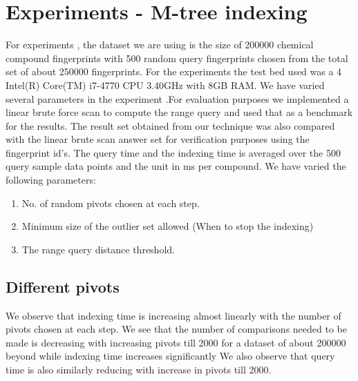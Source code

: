 
\section{Experiments - M-tree indexing}

For experiments , the dataset we are using is the size of 200000 chemical compound fingerprints with 500 random query fingerprints chosen from the total set of about 250000 fingerprints. For the experiments the test bed used was a 4 Intel(R) Core(TM) i7-4770 CPU \@ 3.40GHz with 8GB RAM. We have varied several parameters in the experiment .For evaluation purposes we implemented a linear brute force scan to compute the range query and used that as a benchmark for the results. The result set obtained from our technique was also compared with the linear brute scan answer set for verification purposes using the fingerprint id's. The query time and the indexing time is averaged over the 500 query sample data points and the unit in ms per compound. We have varied the following parameters:

\begin{enumerate}

	\item No. of random pivots chosen at each step.

	\item Minimum size of the outlier set allowed (When to stop the indexing)

	\item The range query distance threshold.	\\
\end{enumerate}

\subsection{Different pivots}

We observe that indexing time is increasing almost linearly with the number of pivots chosen at each step. We see that the number of comparisons needed to be made is decreasing with increasing pivots till 2000 for a dataset of about 200000 beyond while indexing time increases significantly We also observe that query time is also similarly reducing with increase in pivots till 2000.

